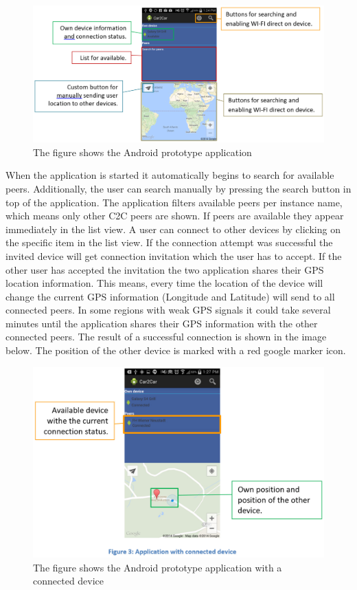\begin{figure}[ht]
	\centering
  \includegraphics[width=\linewidth]{images/androidScreen1.eps}
	\caption{The figure shows the Android prototype application}
	\label{fig1}
\end{figure}

\noindent When the application is started it automatically begins to search for available peers. Additionally, the user can search manually by pressing the search button in top of the application. The application filters available peers per instance name, which means only other C2C peers are shown. If peers are available they appear immediately in the list view. A user can connect to other devices by clicking on the specific item in the list view. If the connection attempt was successful the invited device will get connection invitation which the user has to accept.  If the other user has accepted the invitation the two application shares their GPS location information. This means, every time the location of the device will change the current GPS information (Longitude and Latitude) will send to all connected peers. In some regions with weak GPS signals it could take several minutes until the application shares their GPS information with the other connected peers. The result of a successful connection is shown in the image below. The position of the other device is marked with a red google marker icon.


\begin{figure}[H]
	\centering
  \includegraphics[width=\linewidth]{images/androidScreen2.eps}
	\caption{The figure shows the Android prototype application with a connected device}
	\label{fig1}
\end{figure}


